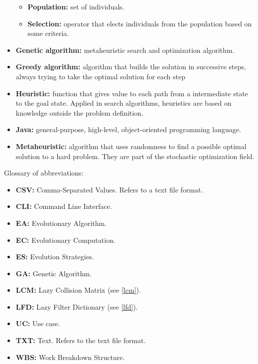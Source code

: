\begin{itemize}
\begin{itemize}
            \item \textbf{Population:} set of individuals.
            \item \textbf{Selection:} operator that elects individuals from the population based on some criteria.
        \end{itemize}
    \item \textbf{Genetic algorithm:} metaheuristic search and optimization algorithm. 
    \item \textbf{Greedy algorithm:} algorithm that builds the solution in successive steps, always trying to take the optimal solution for each step
    \item \textbf{Heuristic:} function that gives value to each path from a intermediate state to the goal state. Applied in search algorithms, heuristics are based on knowledge outside the problem definition.
    \item \textbf{Java:} general-purpose, high-level, object-oriented programming language.
    \item \textbf{Metaheuristic:} algorithm that uses randomness to find a possible optimal solution to a hard problem. They are part of the stochastic optimization field.
\end{itemize}

Glossary of abbreviations:

\begin{itemize}
    \item \textbf{CSV:} Comma-Separated Values. Refers to a text file format.
    \item \textbf{CLI:} Command Line Interface.
    \item \textbf{EA:} Evolutionary Algorithm.
    \item \textbf{EC:} Evolutionary Computation.
    \item \textbf{ES:} Evolution Strategies.
    \item \textbf{GA:} Genetic Algorithm.
    \item \textbf{LCM:} Lazy Collision Matrix (see \ref{lcm}).
    \item \textbf{LFD:} Lazy Filter Dictionary (see \ref{lfd}).
    \item \textbf{UC:} Use case. 
    \item \textbf{TXT:} Text. Refers to the text file format.
    \item \textbf{WBS:} Work Breakdown Structure.
\end{itemize}



